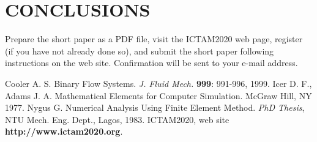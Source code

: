 \documentclass[10pt, a4paper]{article}
\begin{document}
\section{CONCLUSIONS}

Prepare the short paper as a PDF file, visit the ICTAM2020 web page, register (if you have not already done so), and submit the short paper following instructions on the web site. Confirmation will be sent to your e-mail address.


\begin{thebibliography}{9}
Cooler A. S. Binary Flow Systems. \textit{J. Fluid Mech.} \textbf{999}: 991-996, 1999.
Icer D. F., Adams J. A. Mathematical Elements for Computer Simulation. McGraw Hill, NY 1977.
Nygus G. Numerical Analysis Using Finite Element Method. \textit{PhD Thesis}, NTU Mech. Eng. Dept., Lagos, 1983.
ICTAM2020, web site \textbf{http://www.ictam2020.org}.
\end{thebibliography}
\end{document}
